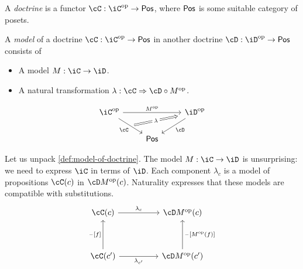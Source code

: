 \documentclass[article,10pt,oneside]{memoir}
\begin{document}
\begin{defn}
  A \emph{doctrine} is a functor $\cC : \iC\op \to \CPos$, where $\mathsf{Pos}$ is some suitable category of posets.
\end{defn}

\begin{defn}\label{def:model-of-doctrine}
  A \emph{model} of a doctrine $\cC : \iC\op \to \CPos$ in another doctrine $\cD : \iD\op \to \CPos$ consists of
  \begin{itemize}
  \item A model $M : \iC \to \iD$.
  \item A natural transformation $\lambda : \cC \To \cD \circ M\op$.
  \end{itemize}
  \[\begin{tikzcd}
      \iC\op && \iD\op \\
      & \CPos
      \arrow["M\op", from=1-1, to=1-3]
      \arrow[""{name=0, anchor=center, inner sep=0}, "\cC"', from=1-1, to=2-2]
      \arrow["\cD", from=1-3, to=2-2]
      \arrow["\lambda"{description}, shorten <=4pt, shorten >=4pt, Rightarrow, from=0, to=1-3]
    \end{tikzcd}\]
\end{defn}

Let us unpack \cref{def:model-of-doctrine}.
The model $M : \iC \to \iD$ is unsurprising: we need to express $\iC$ in terms of $\iD$.
Each component $\lambda_{c}$ is a model of propositions $\cC(c)$ in $\cD M\op(c)$.
Naturality expresses that these models are compatible with substitutions. 
\[\begin{tikzcd}
    {\cC(c)} && {\cD M\op(c)} \\
    \\
    {\cC(c')} && {\cD M\op(c')}
    \arrow["{\lambda_{c}}", from=1-1, to=1-3]
    \arrow["{\blank[f]}", from=3-1, to=1-1]
    \arrow["{\blank[M\op(f)]}"', from=3-3, to=1-3]
    \arrow["{\lambda_{c'}}"', from=3-1, to=3-3]
  \end{tikzcd}\]
\end{document}
